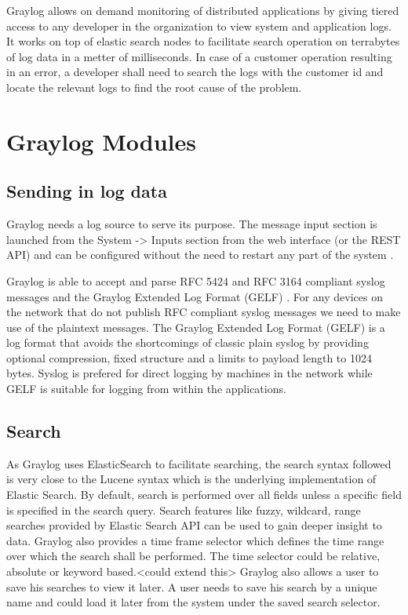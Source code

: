 \documentclass[9pt,twocolumn,twoside]{styles/osajnl}
\begin{document}
Graylog allows on demand monitoring of distributed applications by
giving tiered access to any developer in the organization to view
system and application logs. It works on top of elastic search nodes
to facilitate search operation on terrabytes of log data in a metter
of milliseconds. In case of a customer operation resulting in an
error, a developer shall need to search the logs with the customer id
and locate the relevant logs to find the root cause of the problem.

\section{Graylog Modules}


\subsection{Sending in log data}

Graylog needs a log source to serve its purpose. The message input
section is launched from the System -> Inputs section from the web
interface (or the REST API) and can be configured without the need to
restart any part of the system \cite{www-graylog-sending_data}.

Graylog is able to accept and parse RFC 5424 and RFC 3164 compliant
syslog messages and the Graylog Extended Log Format (GELF)
\cite{www-graylog-sending_data}. For any devices on the network that
do not publish RFC compliant syslog messages we need to make use of
the plaintext messages.  The Graylog Extended Log Format (GELF) is a
log format that avoids the shortcomings of classic plain syslog by
providing optional compression, fixed structure and a limits to
payload length to 1024 bytes. Syslog is prefered for direct logging by
machines in the network while GELF is suitable for logging from within
the applications.

\subsection{Search}

As Graylog uses ElasticSearch to facilitate searching, the search
syntax followed is very close to the Lucene syntax which is the
underlying implementation of Elastic Search. By default, search is
performed over all fields unless a specific field is specified in the
search query. Search features like fuzzy, wildcard, range searches
provided by Elastic Search API can be used to gain deeper insight to
data.  Graylog also provides a time frame selector which defines the
time range over which the search shall be performed. The time selector
could be relative, absolute or keyword based.<could extend this>
Graylog also allows a user to save his searches to view it later. A
user needs to save his search by a unique name and could load it later
from the system under the saved search selector.
 
\end{document}
